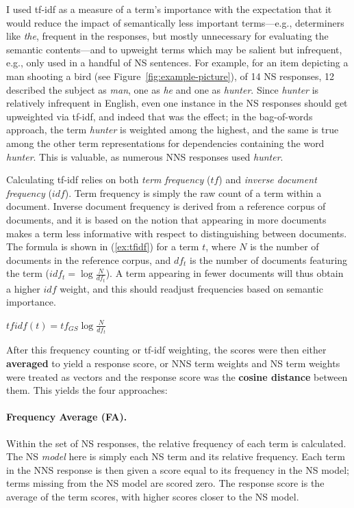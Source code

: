 I used tf-idf as a measure of a term's importance with the expectation that it would reduce the impact
of semantically less important terms---e.g., determiners like
\textit{the}, frequent in the responses, but mostly unnecessary for evaluating the
semantic contents---and to upweight terms which may
be salient but infrequent, e.g., only used in a handful of NS
sentences. For example, for an item depicting a man shooting a bird
(see Figure~\ref{fig:example-picture}), of 14 NS responses, 12 described the subject as \textit{man}, one as \textit{he} and one as
\textit{hunter}. Since \textit{hunter} is relatively infrequent in English, even
one instance in the NS responses should get upweighted via tf-idf, and indeed
that was the effect; in the bag-of-words approach, the term \textit{hunter} is weighted among the highest, and the same is true among the other term representations for dependencies containing the word \textit{hunter}. This is valuable, as numerous NNS responses used \textit{hunter}.

Calculating tf-idf relies on both \emph{term frequency} ($tf$) and
\emph{inverse document frequency} ($idf$).  Term frequency is simply
the raw count of a term within a document. Inverse document frequency is derived from a reference corpus of documents, and it is based on the notion that appearing in more documents makes a term less informative with respect
to distinguishing between documents.  The formula is shown in
(\ref{ex:tfidf}) for a term $t$, where $N$ is the number of documents
in the reference corpus, and $df_{t}$ is the number of documents
featuring the term ($idf_{t} = \log \frac{N}{df_{t}}$).  A term
appearing in fewer documents will thus obtain a higher $idf$ weight,
and this should readjust frequencies based on semantic importance.

\begin{exe}
\ex\label{ex:tfidf} $tfidf(t) = tf_{GS} \log \frac{N}{df_{t}}$
\end{exe}

After this frequency counting or tf-idf weighting, the scores were then either
\textbf{averaged} to yield a response score, or NNS term
weights and NS term weights were treated as vectors and the response
score was the \textbf{cosine distance} between them.  This
yields the four approaches:

\paragraph{Frequency Average (FA).} 
Within the set of NS responses, the relative frequency of each term is calculated. The NS \textit{model} here is simply each NS term and its relative frequency. Each term in
the NNS response is then given a score equal to its frequency in the
NS model; terms missing from the NS model are scored zero. The response score is
the average of the term scores, with higher scores closer to the NS model.

